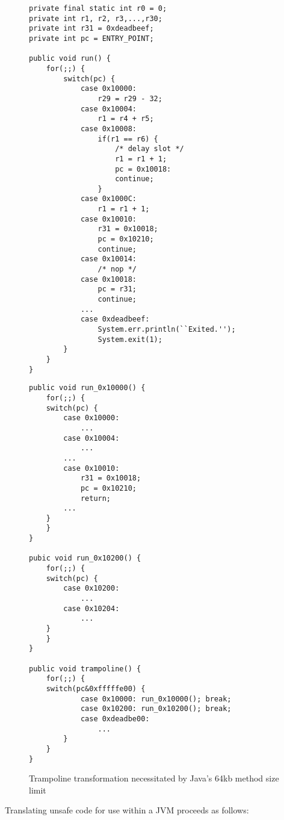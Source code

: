 \documentclass{acmconf}
\begin{document}
\begin{figure*}[t]
\begin{minipage}[c]{7in}%
\begin{multicols}{2}
{\footnotesize\begin{verbatim}
private final static int r0 = 0;
private int r1, r2, r3,...,r30;
private int r31 = 0xdeadbeef;
private int pc = ENTRY_POINT;

public void run() {
    for(;;) {
        switch(pc) {
            case 0x10000:
                r29 = r29 - 32;
            case 0x10004:
                r1 = r4 + r5;
            case 0x10008:
                if(r1 == r6) {
                    /* delay slot */
                    r1 = r1 + 1;
                    pc = 0x10018:
                    continue;
                }
            case 0x1000C:
                r1 = r1 + 1;
            case 0x10010:
                r31 = 0x10018;
                pc = 0x10210;
                continue;
            case 0x10014:
                /* nop */
            case 0x10018:
                pc = r31;
                continue;
            ...
            case 0xdeadbeef:
                System.err.println(``Exited.'');
                System.exit(1);
        }
    }
}
\end{verbatim}}
\vspace{1in}
{\footnotesize\begin{verbatim}
public void run_0x10000() {
    for(;;) {
    switch(pc) {
        case 0x10000:
            ...
        case 0x10004:
            ...
        ...
        case 0x10010:
            r31 = 0x10018;
            pc = 0x10210;
            return;
        ...
    }
    }
}

pubic void run_0x10200() {
    for(;;) {
    switch(pc) {
        case 0x10200:
            ...
        case 0x10204:
            ...
    }
    }
}

public void trampoline() {
    for(;;) {
    switch(pc&0xfffffe00) {
            case 0x10000: run_0x10000(); break;
            case 0x10200: run_0x10200(); break;
            case 0xdeadbe00:
                ...
        }
    }
}
\end{verbatim}}
\end{multicols}
\end{minipage}
\caption{\label{code1} Trampoline transformation necessitated by Java's 64kb method size limit}
\end{figure*}

Translating unsafe code for use within a JVM proceeds as follows:
\end{document}
